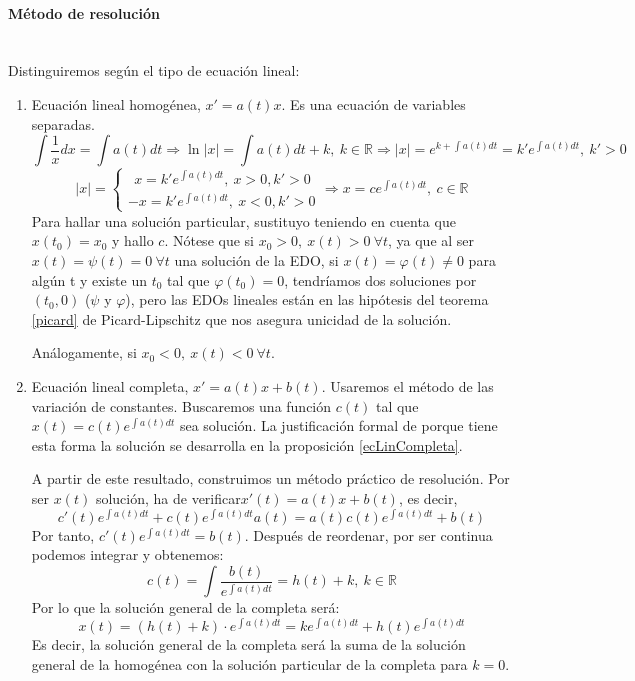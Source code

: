 \documentclass{article}
\providecommand{\abs}[1]{\lvert#1\rvert}
\theoremstyle{theorem-style}  %
\theoremstyle{definition-style}
\theoremstyle{example-style}
\begin{document}
\paragraph{Método de resolución} \ \\
Distinguiremos según el tipo de ecuación lineal:
\begin{enumerate}[\quad i)]
	\item Ecuación lineal homogénea, $ x'=a(t)x $. Es una ecuación de variables separadas.
	\[ \int\frac{1}{x}dx=\int a(t)dt\Rightarrow\ln\abs{x}=\int a(t)dt+k, \ k\in\mathbb{R}\Rightarrow\abs{x}=e^{k+\int a(t)dt}=k'e^{\int a(t)dt}, \ k'>0 \]
	\[ \abs{x}=\begin{cases}
	\ \ x=k'e^{\int a(t)dt}, \ x>0, k'>0\\
	-x=k'e^{\int a(t)dt}, \ x<0, k'>0
	\end{cases}\Rightarrow x=ce^{\int a(t)dt}, \ c\in \mathbb{R}  \]
	Para hallar una solución particular, sustituyo teniendo en cuenta que $ x(t_0)=x_0 $ y hallo $ c $. Nótese que si $ x_0>0,\ x(t)>0\ \forall t $, ya que al ser $ x(t)= \psi(t)=0 \ \forall t$ una solución de la EDO, si $ x(t)= \varphi(t)\neq0 $ para algún t y existe un $ t_0 $ tal que $ \varphi(t_0)=0 $, tendríamos dos soluciones por $ (t_0,0) $ ($ \psi $ y $ \varphi $), pero las EDOs lineales están en las hipótesis del teorema \ref{picard} de Picard-Lipschitz que nos asegura unicidad de la solución.
	
	Análogamente, si $ x_0<0,\ x(t)<0\ \forall t $.
	\item Ecuación lineal completa, $ x'=a(t)x +b(t) $. Usaremos el método de las variación de constantes. Buscaremos una función $ c(t) $ tal que $ x(t)=c(t)e^{\int a(t) dt} $ sea solución. La justificación formal de porque tiene esta forma la solución se desarrolla en la proposición \ref{ecLinCompleta}.
	
	A partir de este resultado, construimos un método práctico de resolución. Por ser $ x(t) $ solución, ha de verificar$ x'(t)=a(t)x+b(t) $, es decir,
	\[ c'(t)e^{\int a(t)dt}+c(t)e^{\int a(t)dt}a(t)=a(t)c(t)e^{\int a(t)dt}+b(t) \]
	Por tanto, $ c'(t)e^{\int a(t)dt}=b(t) $. Después de reordenar, por ser continua podemos integrar y obtenemos:
	\[ c(t)=\int \frac{b(t)}{e^{\int a(t)dt}}=h(t)+k, \ k\in \mathbb{R} \]
	Por lo que la solución general de la completa será:
	\[ x(t)=(h(t)+k)\cdot e^{\int a(t)dt}=ke^{\int a(t)dt}+h(t)e^{\int a(t)dt} \]
	Es decir, la solución general de la completa será la suma de la solución general de la homogénea con la solución particular de la completa para $ k=0 $.
\end{enumerate}
\end{document}

